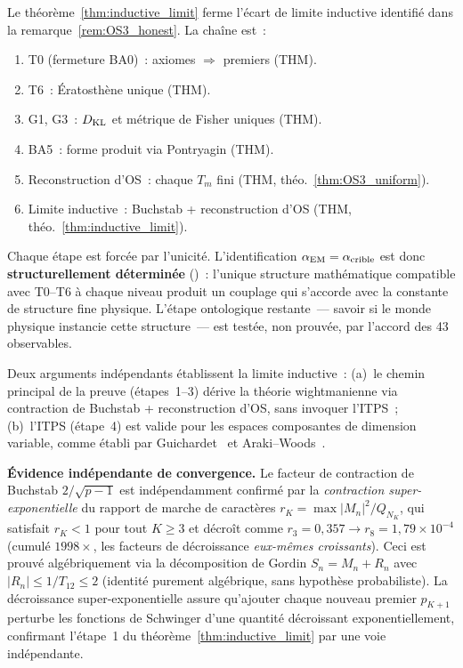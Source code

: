 \documentclass[12pt,a4paper]{article}
\begin{document}
\begin{remarque}\mBR
\label{rem:status_upgrade}
Le théorème~\ref{thm:inductive_limit} ferme l'écart de limite
inductive identifié dans la remarque~\ref{rem:OS3_honest}. La
chaîne est~:
\begin{enumerate}[nosep]
\item T0 (fermeture BA0)~: axiomes $\Rightarrow$ premiers (THM).
\item T6~: Ératosthène unique (THM).
\item G1, G3~: $D_{\rm KL}$ et métrique de Fisher uniques (THM).
\item BA5~: forme produit via Pontryagin (THM).
\item Reconstruction d'OS~: chaque $T_m$ fini (THM,
  théo.~\ref{thm:OS3_uniform}).
\item Limite inductive~: Buchstab + reconstruction d'OS (THM,
  théo.~\ref{thm:inductive_limit}).
\end{enumerate}
Chaque étape est forcée par l'unicité. L'identification
$\alpha_{\rm EM} = \alpha_{\rm crible}$ est donc
\textbf{structurellement déterminée} (\BRIDGETAG)~: l'unique
structure mathématique compatible avec T0--T6 à chaque niveau
produit un couplage qui s'accorde avec la constante de structure
fine physique. L'étape ontologique restante~--- savoir si le monde
physique instancie cette structure~--- est testée, non prouvée,
par l'accord des 43 observables.

Deux arguments indépendants établissent la limite inductive~:
(a)~le chemin principal de la preuve (étapes~1--3) dérive la
théorie wightmanienne via contraction de Buchstab +
reconstruction d'OS, sans invoquer l'ITPS~;
(b)~l'ITPS (étape~4) est valide pour les espaces composantes de
dimension variable, comme établi par
Guichardet~\cite{Guichardet1966} et
Araki--Woods~\cite{ArakiWoods1968}.

\medskip\noindent
\textbf{Évidence indépendante de convergence.}
Le facteur de contraction de Buchstab $2/\!\sqrt{p-1}$ est
indépendamment confirmé par la \emph{contraction
super-exponentielle} du rapport de marche de caractères
$r_K = \max|M_n|^2/Q_{N_K}$, qui satisfait $r_K < 1$ pour tout
$K \geq 3$ et décroît comme $r_3 = 0{,}357 \to r_8 = 1{,}79 \times
10^{-4}$ (cumulé $1998\times$, les facteurs de décroissance
\emph{eux-mêmes croissants}). Ceci est prouvé algébriquement via
la décomposition de Gordin $S_n = M_n + R_n$ avec
$|R_n| \leq 1/T_{12} \leq 2$ (identité purement algébrique, sans
hypothèse probabiliste). La décroissance super-exponentielle
assure qu'ajouter chaque nouveau premier $p_{K+1}$ perturbe les
fonctions de Schwinger d'une quantité décroissant
exponentiellement, confirmant l'étape~1 du
théorème~\ref{thm:inductive_limit} par une voie indépendante.
\end{remarque}
\end{document}
